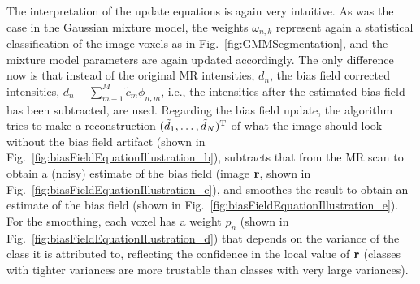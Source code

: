 \documentclass[10pt,twoside]{book}
\begin{document}
The interpretation of the update equations is again very intuitive. As was the case in the Gaussian mixture model, the weights $\omega_{n,k}$
represent again a statistical classification of the image voxels as in Fig.~\ref{fig:GMMSegmentation}, and the mixture model parameters
are again updated accordingly. The only difference now is that instead of the original MR intensities, $d_n$, the bias field corrected
intensities, $d_n - \sum_{m-1}^M \tilde{c}_m \phi_{n,m}$, i.e., the intensities after the estimated bias field has been subtracted, are used.
Regarding the bias field update, the algorithm tries to make a reconstruction $(\tilde{d}_1, \ldots, \tilde{d}_N)^\mathrm{T}$ of what 
the image should look without the bias field artifact (shown in Fig.~\ref{fig:biasFieldEquationIllustration_b}), 
subtracts that from the MR scan to obtain a (noisy) estimate of the bias field (image $\mathbf{r}$, shown in Fig.~\ref{fig:biasFieldEquationIllustration_c}), 
and smoothes the result to obtain an estimate of the bias field
(shown in Fig.~\ref{fig:biasFieldEquationIllustration_e}). For the smoothing, each voxel has a weight $p_n$ 
(shown in Fig.~\ref{fig:biasFieldEquationIllustration_d}) that depends on the variance of the class it is attributed
to, reflecting the confidence in the local value of $\mathbf{r}$ (classes with tighter variances are more trustable than
classes with very large variances).
\end{document}
